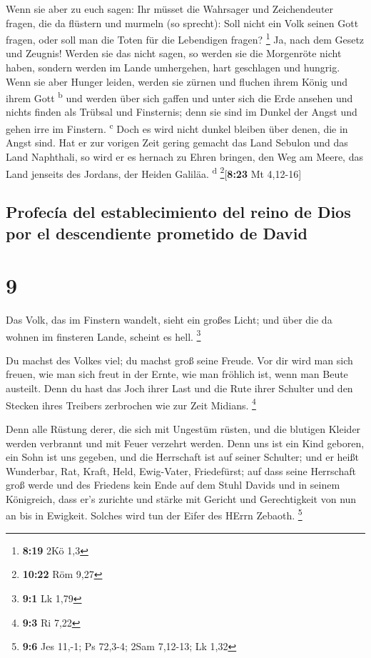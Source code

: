  Wenn sie aber zu euch sagen: Ihr müsset die Wahrsager
und Zeichendeuter fragen, die da flüstern und murmeln (so sprecht): Soll
nicht ein Volk seinen Gott fragen, oder soll man die Toten für die
Lebendigen fragen? \footnote{\textbf{8:19} 2Kö 1,3}  Ja,
nach dem Gesetz und Zeugnis! Werden sie das nicht sagen, so werden sie
die Morgenröte nicht haben,  sondern werden im Lande
umhergehen, hart geschlagen und hungrig. Wenn sie aber Hunger leiden,
werden sie zürnen und fluchen ihrem König und ihrem Gott
\textsuperscript{b}  und werden über sich gaffen und
unter sich die Erde ansehen und nichts finden als Trübsal und
Finsternis; denn sie sind im Dunkel der Angst und gehen irre im
Finstern. \textsuperscript{c}  Doch es wird nicht dunkel
bleiben über denen, die in Angst sind. Hat er zur vorigen Zeit gering
gemacht das Land Sebulon und das Land Naphthali, so wird er es hernach
zu Ehren bringen, den Weg am Meere, das Land jenseits des Jordans, der
Heiden Galiläa. \textsuperscript{d} \footnote{\textbf{10:22} Röm 9,27}{[}\textbf{8:23}
Mt 4,12-16{]}

\hypertarget{profecuxeda-del-establecimiento-del-reino-de-dios-por-el-descendiente-prometido-de-david}{%
\subsection{Profecía del establecimiento del reino de Dios por el
descendiente prometido de
David}\label{profecuxeda-del-establecimiento-del-reino-de-dios-por-el-descendiente-prometido-de-david}}

\hypertarget{section-8}{%
\section{9}\label{section-8}}

 Das Volk, das im Finstern wandelt, sieht ein großes
Licht; und über die da wohnen im finsteren Lande, scheint es hell.
\footnote{\textbf{9:1} Lk 1,79}

 Du machst des Volkes viel; du machst groß seine Freude.
Vor dir wird man sich freuen, wie man sich freut in der Ernte, wie man
fröhlich ist, wenn man Beute austeilt.  Denn du hast das
Joch ihrer Last und die Rute ihrer Schulter und den Stecken ihres
Treibers zerbrochen wie zur Zeit Midians. \footnote{\textbf{9:3} Ri 7,22}

 Denn alle Rüstung derer, die sich mit Ungestüm rüsten,
und die blutigen Kleider werden verbrannt und mit Feuer verzehrt werden.
 Denn uns ist ein Kind geboren, ein Sohn ist uns gegeben,
und die Herrschaft ist auf seiner Schulter; und er heißt Wunderbar, Rat,
Kraft, Held, Ewig-Vater, Friedefürst;  auf dass seine
Herrschaft groß werde und des Friedens kein Ende auf dem Stuhl Davids
und in seinem Königreich, dass er's zurichte und stärke mit Gericht und
Gerechtigkeit von nun an bis in Ewigkeit. Solches wird tun der Eifer des
HErrn Zebaoth. \footnote{\textbf{9:6} Jes 11,-1; Ps 72,3-4; 2Sam
  7,12-13; Lk 1,32}

